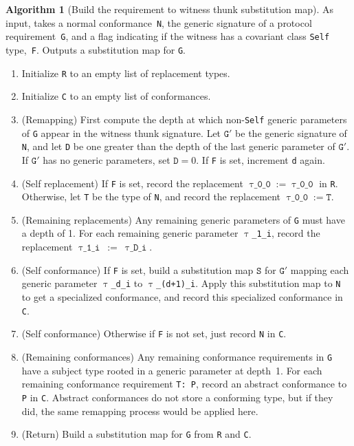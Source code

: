 \documentclass[a4paper,headsepline,bibliography=totoc,toc=flat,fleqn,twoside=semi]{scrbook}
\theoremstyle{definition}
\theoremstyle{definition}
\theoremstyle{definition}
\newtheorem{algorithm}{Algorithm}[chapter]
\newcommand{\ttgp}[2]{\texttt{$\uptau$\_#1\_#2}}
\begin{document}
\begin{algorithm}[Build the requirement to witness thunk substitution map] As input, takes a normal conformance~\texttt{N}, the generic signature of a protocol requirement~\texttt{G}, and a flag indicating if the witness has a covariant class \texttt{Self} type,~\texttt{F}. Outputs a substitution map for \texttt{G}.
\begin{enumerate}
\item Initialize \texttt{R} to an empty list of replacement types.
\item Initialize \texttt{C} to an empty list of conformances.
\item (Remapping) First compute the depth at which non-\texttt{Self} generic parameters of \texttt{G} appear in the witness thunk signature. Let $\texttt{G}'$ be the generic signature of \texttt{N}, and let \texttt{D} be one greater than the depth of the last generic parameter of $\texttt{G}'$. If $\texttt{G}'$ has no generic parameters, set $\texttt{D}=0$. If \texttt{F} is set, increment \texttt{d} again.
\item (Self replacement) If \texttt{F} is set, record the replacement $\ttgp{0}{0} := \ttgp{0}{0}$ in \texttt{R}. Otherwise, let \texttt{T} be the type of \texttt{N}, and record the replacement $\ttgp{0}{0} := \texttt{T}$.
\item (Remaining replacements) Any remaining generic parameters of \texttt{G} must have a depth of 1. For each remaining generic parameter \ttgp{1}{i},  record the replacement $\ttgp{1}{i}~:=~\ttgp{D}{i}$.
\item (Self conformance) If \texttt{F} is set, build a substitution map $\texttt{S}$ for $\texttt{G}'$ mapping each generic parameter \ttgp{d}{i} to \ttgp{(d+1)}{i}. Apply this substitution map to \texttt{N} to get a specialized conformance, and record this specialized conformance in \texttt{C}.
\item (Self conformance) Otherwise if \texttt{F} is not set, just record \texttt{N} in \texttt{C}.
\item (Remaining conformances) Any remaining conformance requirements in \texttt{G} have a subject type rooted in a generic parameter at depth~1. For each remaining conformance requirement \texttt{T:~P}, record an abstract conformance to \texttt{P} in \texttt{C}. Abstract conformances do not store a conforming type, but if they did, the same remapping process would be applied here.
\item (Return) Build a substitution map for \texttt{G} from \texttt{R} and \texttt{C}.
\end{enumerate}
\end{algorithm}
\end{document}

